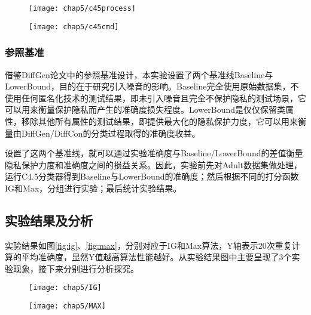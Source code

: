 \begin{figure}[!htp]
	\centering
	\texttt{[image: chap5/c45process]}
\end{figure}

\begin{figure}[!htp]
	\centering
	\texttt{[image: chap5/c45cmd]}
\end{figure}

\subsubsection{参照基准}

借鉴DiffGen论文中的参照基准设计，本实验设置了两个基准线Baseline与LowerBound，目的在于研究引入噪音的影响。Baseline完全使用原始数据集，不使用任何匿名化技术的测试结果，即未引入噪音且完全不保护隐私的测试场景，它可以用来衡量保护隐私而产生的准确度损失程度。LowerBound是仅仅保留类属性，移除其他所有属性的测试结果，即提供最大化的隐私保护力度，它可以用来衡量由DiffGen/DiffCon的分类过程取得的准确度收益。

设置了这两个基准线，就可以通过实验准确度与Baseline/LowerBound的差值衡量隐私保护力度和准确度之间的损益关系。因此，实验前先对Adult数据集做处理，运行C4.5分类器得到Baseline与LowerBound的准确度；然后根据不同的打分函数IG和Max，分组进行实验；最后统计实验结果。

\subsection{实验结果及分析}    

实验结果如图\ref{fig:ig}、\ref{fig:max}，分别对应于IG和Max算法，Y轴表示20次重复计算的平均准确度，显然Y值越高算法性能越好。从实验结果图中主要呈现了3个实验现象，接下来分别进行分析探究。

\begin{figure}[!htp]
	\centering
	\texttt{[image: chap5/IG]}
\end{figure}

\begin{figure}[!htp]
	\centering
	\texttt{[image: chap5/MAX]}
\end{figure}

